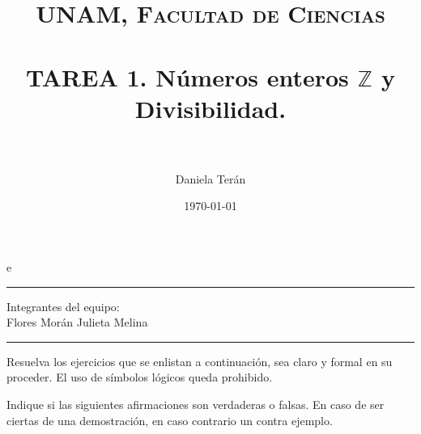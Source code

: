 e\documentclass[fontsize=12pt]{scrartcl}
\title{	
	\normalfont \normalsize 
	\textsc{UNAM, Facultad de Ciencias} \\ [25pt] 
	\horrule{0.5pt} \\[0.4cm] 
	\huge TAREA 1. N\'umeros enteros $\mathbb{Z}$ y Divisibilidad.\\ 
	\horrule{2pt} \\[0.5cm] 
}
\author{Daniela Ter\'an}
\date{\normalsize\today}
\begin{document}
\maketitle
\begin{center}
		\noindent \rule{\textwidth}{1pt}
		Integrantes del equipo:\\
		Flores Morán Julieta Melina\\
%		
		\noindent\rule{\textwidth}{1pt}  
\end{center}

	Resuelva los ejercicios que se enlistan a continuaci\'on, sea claro y formal 
	en su proceder. El uso de s\'imbolos l\'ogicos queda prohibido.
		
	Indique si las siguientes afirmaciones son verdaderas o falsas. En caso de 
	ser ciertas de una demostraci\'on, en caso contrario un contra ejemplo.
	
\end{document}
